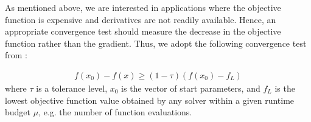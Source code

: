 

\noindent As mentioned above, we are interested in applications where the objective function is expensive and derivatives are not readily available. Hence, an appropriate convergence test should measure the decrease in the objective function rather than the gradient.
Thus, we adopt the following convergence test from \cite{MoreWild2009}:


\begin{align}
        f(x_0) - f(x) \geq (1 - \tau)(f(x_0) - f_L)
        \label{eq:benchmarking-convergence-test}
\end{align}
where $\tau$ is a tolerance level, $x_0$ is the vector of start parameters, and $f_L$ is the lowest objective function value obtained by any solver within a given runtime budget $\mu$, e.g. the number of function evaluations.

